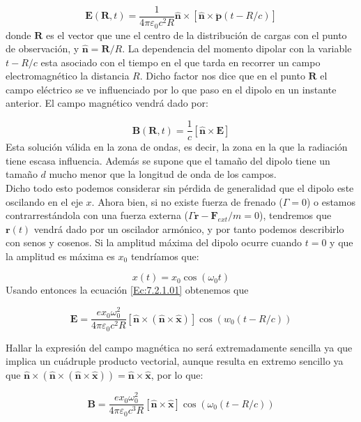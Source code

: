 \documentclass[12pt]{article}
\newcommand{\Bn}{\mathbf{B}}
\newcommand{\En}{\mathbf{E}}
\newcommand{\Fn}{\mathbf{F}}
\newcommand{\rn}{\mathbf{r}}
\newcommand{\pn}{\mathbf{p}}
\newcommand{\Rn}{\mathbf{R}}
\newcommand{\hnn}{\hat{\mathbf{n}}}
\newcommand{\hnx}{\hat{\mathbf{x}}}
\numberwithin{equation}{section}
\numberwithin{figure}{section}
\begin{document}
\begin{equation}
\En (\Rn,t) = \dfrac{1}{4 \pi  \varepsilon_0 c^2 R} \hnn \times \left[ \hnn \times \ddot{\pn} (t - R/c) \right] \label{Ec:7.2.1.01}
 \end{equation}  
donde $\Rn$ es el vector que une el centro de la distribución de cargas con el punto de observación, y $\hnn  = \Rn / R$. La dependencia del momento dipolar con la variable $t-R/c$ esta asociado con el tiempo en el que tarda en recorrer un campo electromagnético la distancia $R$. Dicho factor nos dice que en el punto $\Rn$ el campo eléctrico se ve influenciado por lo que paso en el dipolo en un instante anterior. El campo magnético vendrá dado por:

\begin{equation}
\Bn (\Rn, t) = \dfrac{1}{c} [\hnn \times \En]
\end{equation}
Esta solución válida en la zona de ondas, es decir, la zona en la que la radiación tiene escasa influencia. Además se supone que el tamaño del dipolo tiene un tamaño $d$ mucho menor que la longitud de onda de los campos. \\

Dicho todo esto podemos considerar sin pérdida de generalidad que el dipolo este oscilando en el eje $x$. Ahora bien, si no existe fuerza de frenado ($\Gamma = 0$) o estamos contrarrestándola con una fuerza externa ($\Gamma \dot{\rn}-\Fn_{ext}/m = 0$), tendremos que $\rn(t)$ vendrá dado por un oscilador armónico, y por tanto podemos describirlo con senos y cosenos. Si la amplitud máxima del dipolo ocurre cuando $t=0$ y que la amplitud es máxima es $x_0$ tendríamos que:

\begin{equation}
x(t) = x_0 \cos (\omega_0 t) 
\end{equation}
Usando entonces la ecuación \ref{Ec:7.2.1.01} obtenemos que

\begin{equation}
\En = \dfrac{e x_0 \omega_0^2 }{4 \pi \varepsilon_0 c^2 R } [\hnn \times (\hnn \times \hnx)] \cos (w_0 (t-R/c))
\end{equation}

Hallar la expresión del campo magnética no será extremadamente sencilla ya que implica un cuádruple producto vectorial, aunque resulta en extremo sencillo ya que $\hnn \times (\hnn \times (\hnn \times \hnx)) = \hnn \times \hnx$, por lo que:

\begin{equation}
\Bn = \dfrac{e x_0 \omega_0^2}{4 \pi \varepsilon_0 c^3 R} [\hnn \times \hnx] \cos (\omega_0 (t-R/c)) 
\end{equation}
\end{document}
